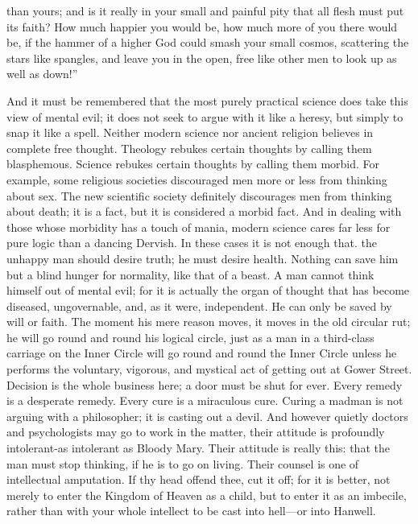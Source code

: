 \documentclass{book}
\begin{document}
than yours; and is it really in your small and painful pity that all flesh must put its faith? How much happier you would be, how much more of you there would be, if the hammer of a higher God could smash your small cosmos, scattering the stars like spangles, and leave you in the open, free like other men to look up as well as down!”

And it must be remembered that the most purely practical science does take this view of mental evil; it does not seek to argue with it like a heresy, but simply to snap it like a spell. Neither modern science nor ancient religion believes in complete free thought. Theology rebukes certain thoughts by calling them blasphemous. Science rebukes certain thoughts by calling them morbid. For example, some religious societies discouraged men more or less from thinking about sex. The new scientific society definitely discourages men from thinking about death; it is a fact, but it is considered a morbid fact. And in dealing with those whose morbidity has a touch of mania, modern science cares far less for pure logic than a dancing Dervish. In these cases it is not enough that. the unhappy man should desire truth; he must desire health. Nothing can save him but a blind hunger for normality, like that of a beast. A man cannot think himself out of mental evil; for it is actually the organ of thought that has become diseased, ungovernable, and, as it were, independent. He can only be saved by will or faith. The moment his mere reason moves, it moves in the old circular rut; he will go round and round his logical circle, just as a man in a third-class carriage on the Inner Circle will go round and round the Inner Circle unless he performs the voluntary, vigorous, and mystical act of getting out at Gower Street. Decision is the whole business here; a door must be shut for ever. Every remedy is a desperate remedy. Every cure is a miraculous cure. Curing a madman is not arguing with a philosopher; it is casting out a devil. And however quietly doctors and psychologists may go to work in the matter, their attitude is profoundly intolerant-as intolerant as Bloody Mary. Their attitude is really this: that the man must stop thinking, if he is to go on living. Their counsel is one of intellectual amputation. If thy head offend thee, cut it off; for it is better, not merely to enter the Kingdom of Heaven as a child, but to enter it as an imbecile, rather than with your whole intellect to be cast into hell—or into Hanwell.
\end{document}
